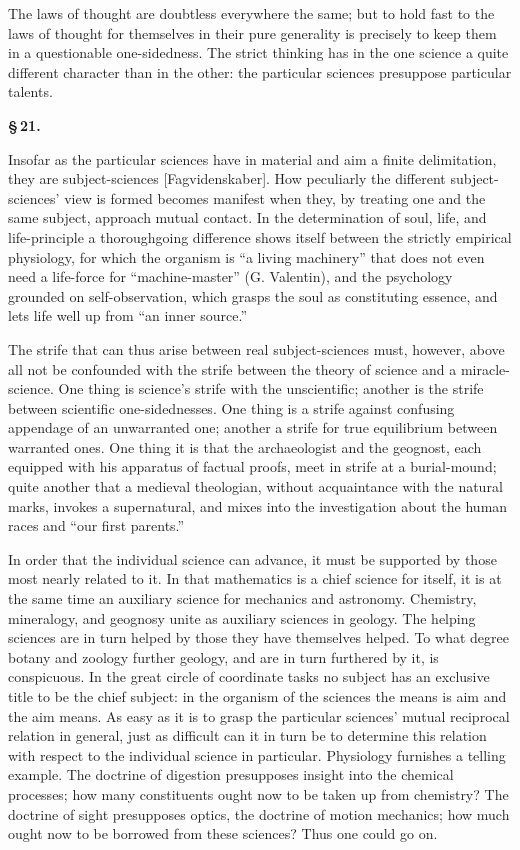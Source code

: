 \documentclass[12pt]{book}
\begin{document}
The laws of thought are doubtless everywhere the same; but to hold fast to the laws of thought for themselves in
their pure generality is precisely to keep them in a questionable one-sidedness. The strict thinking has in the
one science a quite different character than in the other: the particular sciences presuppose particular talents.

\begin{center}{\bfseries \S\,21.}\end{center}

Insofar as the particular sciences have in material and aim a finite delimitation, they are subject-sciences
[Fagvidenskaber]. How peculiarly the different subject-sciences' view is
formed becomes manifest when they, by treating one and the same subject, approach mutual contact. In the
determination of soul, life, and life-principle a thoroughgoing difference shows itself between the strictly
empirical physiology, for which the organism is ``a living machinery'' that does not even need a life-force for
``machine-master'' (G. Valentin), and the psychology grounded on self-observation, which grasps the soul as
constituting essence, and lets life
well up from ``an inner source.''

The strife that can thus arise between real subject-sciences must, however, above all not
be confounded with the strife between the theory of science and a miracle-science. One
thing is science's strife with the unscientific; another is the strife between scientific
one-sidednesses. One thing is a strife against confusing appendage of an unwarranted one;
another a strife for true equilibrium between warranted ones. One thing it is that the
archaeologist and the geognost, each equipped with his apparatus of factual proofs, meet
in strife at a burial-mound; quite another that a medieval theologian, without acquaintance
with the natural marks, invokes a supernatural, and mixes into the investigation about the
human races and ``our first parents.''

In order that the individual science can advance, it must be supported by those most nearly
related to it. In that mathematics is a chief science for itself, it is at the same time an
auxiliary science for mechanics and astronomy. Chemistry, mineralogy, and geognosy unite as
auxiliary sciences in geology. The helping sciences are in turn helped by those they have
themselves helped. To what degree botany and zoology further geology, and are in turn
furthered by it, is conspicuous. In the great circle of coordinate tasks no subject has an
exclusive title to be the chief subject: in the organism of the sciences the means is aim
and the aim means.
As easy as it is to grasp the particular sciences' mutual reciprocal relation in general,
just as difficult can it in turn be to determine this relation with respect to the
individual science in particular. Physiology furnishes a telling example. The doctrine of
digestion presupposes insight into the chemical processes; how many constituents ought now
to be taken up from chemistry? The doctrine of sight presupposes optics, the doctrine of
motion mechanics; how much ought now to be borrowed from these sciences? Thus one could go
on.
\end{document}
